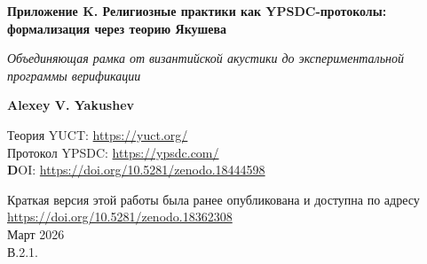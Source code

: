 \documentclass[12pt,a4paper]{article}
\begin{document}
	
	\begin{titlepage}
		\begin{center}
			\vspace*{0cm}
			
			\Huge\textbf{Приложение K. Религиозные практики как YPSDC-протоколы: формализация через теорию Якушева}
			
			\vspace{1cm}
			
			\small\textit{Объединяющая рамка от византийской акустики до экспериментальной программы верификации}
			
			\vspace{0.5cm}
			
			\small\textbf{Alexey V. Yakushev}
			
			\vspace{0cm}
			
			Теория YUCT: \url{https://yuct.org/}\\
			Протокол YPSDC: \url{https://ypsdc.com/}\\
			
			
			\vspace{2cm}
			\textbf DOI: \url{https://doi.org/10.5281/zenodo.18444598}\\
			
			\vspace{1cm}
			
			\vspace{0cm}
			\large 
			Краткая версия этой работы была ранее опубликована и доступна по адресу\\ \url{https://doi.org/10.5281/zenodo.18362308}\\
			\vspace{1cm}
			Март 2026 \\ \large В.2.1.
			\newpage
			\begin{abstract}
				\noindent
				Данный документ представляет всестороннюю формализацию религиозных практик через призму Объединённой теории координации Якушева (YUCT) и протокола YPSDC (Протокол синхронной распределённой координации Якушева). Часть 1 демонстрирует, как религиозные ритуалы функционируют как высокооптимизированные координационные протоколы, использующие предварительно распределённые словари, причём византийская церковная акустика служит парадигматическим примером архитектурной оптимизации координационной эффективности. Часть 2 описывает экстремальную объединяющую силу рамки YUCT и представляет детальную исследовательскую программу экспериментальной верификации, подчёркивая студенческие исследования как краеугольный камень научной валидации. Рамка предоставляет измеримые метрики ($K_{\mathrm{eff}}$), проверяемые предсказания и междисциплинарные приложения — от физики и биологии до социологии и религиоведения.
			\end{abstract}
			

\end{center}
\end{titlepage}
\end{document}
